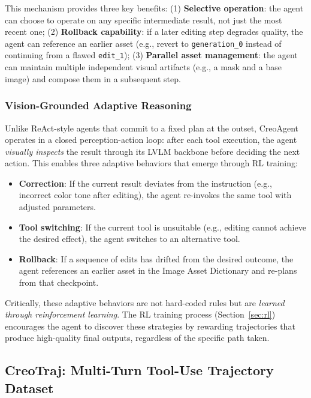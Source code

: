 \documentclass{article}
\begin{document}
This mechanism provides three key benefits: (1) \textbf{Selective operation}: the agent can choose to operate on any specific intermediate result, not just the most recent one; (2) \textbf{Rollback capability}: if a later editing step degrades quality, the agent can reference an earlier asset (e.g., revert to \texttt{generation\_0} instead of continuing from a flawed \texttt{edit\_1}); (3) \textbf{Parallel asset management}: the agent can maintain multiple independent visual artifacts (e.g., a mask and a base image) and compose them in a subsequent step.

\subsubsection{Vision-Grounded Adaptive Reasoning}

Unlike ReAct-style agents \cite{yao2022react} that commit to a fixed plan at the outset, CreoAgent operates in a closed perception-action loop: after each tool execution, the agent \textit{visually inspects} the result through its LVLM backbone before deciding the next action. This enables three adaptive behaviors that emerge through RL training:

\begin{itemize}
    \item \textbf{Correction}: If the current result deviates from the instruction (e.g., incorrect color tone after editing), the agent re-invokes the same tool with adjusted parameters.
    \item \textbf{Tool switching}: If the current tool is unsuitable (e.g., editing cannot achieve the desired effect), the agent switches to an alternative tool.
    \item \textbf{Rollback}: If a sequence of edits has drifted from the desired outcome, the agent references an earlier asset in the Image Asset Dictionary and re-plans from that checkpoint.
\end{itemize}

Critically, these adaptive behaviors are not hard-coded rules but are \textit{learned through reinforcement learning}. The RL training process (Section~\ref{sec:rl}) encourages the agent to discover these strategies by rewarding trajectories that produce high-quality final outputs, regardless of the specific path taken.

\subsection{CreoTraj: Multi-Turn Tool-Use Trajectory Dataset}
\end{document}
